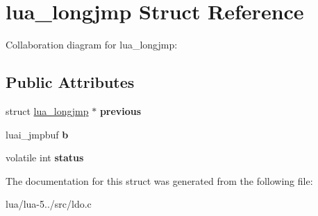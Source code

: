 \hypertarget{structlua__longjmp}{\section{lua\+\_\+longjmp Struct Reference}
\label{structlua__longjmp}
}


Collaboration diagram for lua\+\_\+longjmp\+:
\subsection*{Public Attributes}
\begin{DoxyCompactItemize}
\item 
\hypertarget{structlua__longjmp_aaad0b53cd52f1242bb179452c399dac0}{struct \hyperlink{structlua__longjmp}{lua\+\_\+longjmp} $\ast$ {\bfseries previous}}\label{structlua__longjmp_aaad0b53cd52f1242bb179452c399dac0}

\item 
\hypertarget{structlua__longjmp_aec434d21a87f62041e1de5db0dac1eb5}{luai\+\_\+jmpbuf {\bfseries b}}\label{structlua__longjmp_aec434d21a87f62041e1de5db0dac1eb5}

\item 
\hypertarget{structlua__longjmp_a0efc1d6a7a767e23c2469ae80aeb3ced}{volatile int {\bfseries status}}\label{structlua__longjmp_a0efc1d6a7a767e23c2469ae80aeb3ced}

\end{DoxyCompactItemize}


The documentation for this struct was generated from the following file\+:\begin{DoxyCompactItemize}
\item 
lua/lua-\/5../src/ldo.\+c\end{DoxyCompactItemize}
